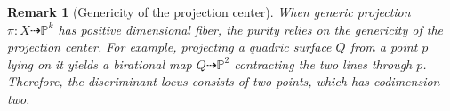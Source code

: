 \documentclass[12pt]{amsart}
\newtheorem{remark}[theorem]{Remark}
\begin{document}

\begin{remark}[Genericity of the projection center]\normalfont \label{remark_proj-from-p-on-Q}
When generic projection $\pi:X\dashrightarrow \mathbb P^k$ has positive dimensional fiber, the purity relies on the genericity of the projection center. For example, projecting a quadric surface $Q$ from a point $p$ lying on it yields a birational map $Q\dashrightarrow \mathbb P^2$ contracting the two lines through $p$. Therefore, the discriminant locus consists of two points, which has codimension two.

\end{remark}


\end{document}
